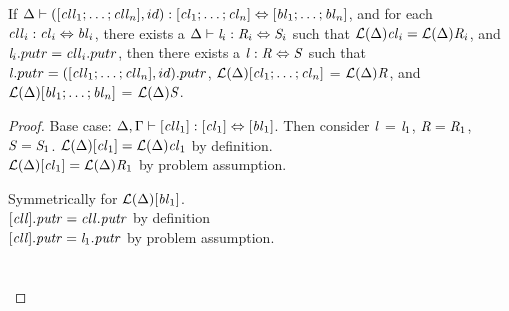 \begin{lemma}
\label{lem:id-dnf}
If $\Delta \vdash ([\mathit{cll}_1 ; \ldots ; \mathit{cll}_n],id) : [\mathit{cl}_1 ; \ldots ; \mathit{cl}_n] \Leftrightarrow [\mathit{bl}_1 ; \ldots ; \mathit{bl}_n]$,
and for each $\mathit{cll}_i : \mathit{cl}_i \Leftrightarrow \mathit{bl}_i$,
there exists a $\Delta \vdash \mathit{l}_i : \mathit{R}_i \Leftrightarrow \mathit{S}_i$ such that
$\mathcal{L}(\Delta){\mathit{cl}_i}=\mathcal{L}(\Delta){\mathit{R}_i}$, and $\mathit{l}_i.putr = \mathit{cll}_i.putr$,
then there exists a $\mathit{l} : \mathit{R} \Leftrightarrow \mathit{S}$ such that $\mathit{l}.putr = ([\mathit{cll}_1 ; \ldots ; \mathit{cll}_n],id).putr$, $\mathcal{L}(\Delta){[\mathit{cl}_1 ; \ldots ; \mathit{cl}_n]}$ = $\mathcal{L}(\Delta){\mathit{R}}$,
and $\mathcal{L}(\Delta){[\mathit{bl}_1 ; \ldots ; \mathit{bl}_n]}$ = $\mathcal{L}(\Delta){\mathit{S}}$.
\begin{proof}
Base case: $\Delta, \Gamma \vdash [\mathit{cll}_1] : [\mathit{cl}_1] \Leftrightarrow [\mathit{bl}_1]$.  Then consider $\mathit{l}$ = $\mathit{l}_1$, $\mathit{R} = \mathit{R}_1$, $\mathit{S} = \mathit{S}_1$.
$\mathcal{L}(\Delta){[\mathit{cl}_1]} = \mathcal{L}(\Delta){\mathit{cl}_1}$ by definition.\\
$\mathcal{L}(\Delta){[\mathit{cl}_1]} = \mathcal{L}(\Delta){\mathit{R}_1}$ by problem assumption.

Symmetrically for $\mathcal{L}(\Delta){[\mathit{bl}_1]}$.\\
$[\mathit{cll}].\mathit{putr} = \mathit{cll}.\mathit{putr}$ by definition\\
$[\mathit{cll}].\mathit{putr} = \mathit{l}_1.\mathit{putr}$ by problem assumption.
\\\\\\




\end{proof}
\end{lemma}
